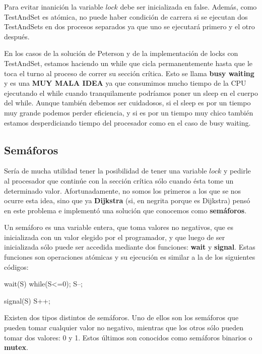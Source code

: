 \documentclass{article}
\begin{document}
Para evitar inanici\'on la variable $lock$ debe ser inicializada en false. Adem\'as, como TestAndSet es at\'omica, no puede haber condici\'on de carrera si se ejecutan dos TestAndSets en dos procesos separados ya que uno se ejecutar\'a primero y el otro despu\'es.

En los casos de la soluci\'on de Peterson y de la implementaci\'on de locks con TestAndSet, estamos haciendo un while que cicla permanentemente hasta que le toca el turno al proceso de correr su secci\'on cr\'itica. Esto se llama \textbf{busy waiting} y es una \textbf{MUY MALA IDEA} ya que consumimos mucho tiempo de la CPU ejecutando el while cuando tranquilamente podr\'iamos poner un sleep en el cuerpo del while. Aunque tambi\'en debemos ser cuidadosos, si el sleep es por un tiempo muy grande podemos perder eficiencia, y si es por un tiempo muy chico tambi\'en estamos desperdiciando tiempo del procesador como en el caso de busy waiting.

\subsection{Sem\'aforos}

Ser\'ia de mucha utilidad tener la posibilidad de tener una variable $lock$ y pedirle al procesador que contin\'ue con la secci\'on cr\'itica s\'olo cuando \'esta tome un determinado valor. Afortunadamente, no somos los primeros a los que se nos ocurre esta idea, sino que ya \textbf{Dijkstra} (si, en negrita porque es Dijkstra) pens\'o en este problema e implement\'o una soluci\'on que conocemos como \textbf{sem\'aforos}.

Un sem\'aforo es una variable entera, que toma valores no negativos, que es inicializada con un valor elegido por el programador, y que luego de ser inicializada s\'olo puede ser accedida mediante dos funciones: \textbf{wait} y \textbf{signal}. Estas funciones son operaciones at\'omicas y su ejecuci\'on es similar a la de los siguientes c\'odigos:

\begin{code}
wait(S)
{
    while(S<=0);
		S--;
}
\end{code}

\begin{code}
signal(S)
{
    S++;
}
\end{code}

Existen dos tipos distintos de sem\'aforos. Uno de ellos son los sem\'aforos que pueden tomar cualquier valor no negativo, mientras que los otros s\'olo pueden tomar dos valores: 0 y 1. Estos \'ultimos son conocidos como sem\'aforos binarios o \textbf{mutex}.
\end{document}
